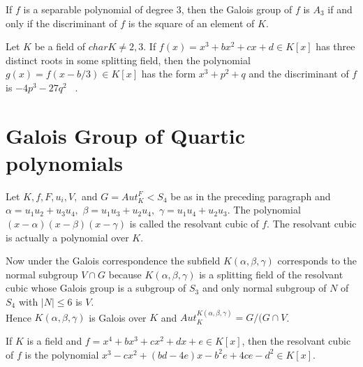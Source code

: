 \begin{corollary}
  If \(f\) is a separable polynomial of degree \(3\), then the Galois group of \(f\) is \(A_3\) if and only if the discriminant of \(f\) is the square of an element of \(K\).
\end{corollary}

\begin{theorem}
  Let \(K\) be a field of \(char K \neq 2,3 \). If \(f(x)=x^3+bx^2+cx+d \in K[x]\) has three distinct roots in some splitting field, then the polynomial \(g(x)=f(x-b/3) \in K[x]\) has the form \(x^3+p^2+q\) and the discriminant of \(f\) is \(-4p^3-27q^2\) ~\cite{hunger}.
\end{theorem}

\section{Galois Group of Quartic polynomials}
\begin{definition}
Let \(K, f, F, u_i, V,\) and \(G=Aut_K^F<S_4\) be as in the preceding paragraph and \(\alpha=u_1u_2+u_3u_4,\) \(\beta=u_1u_3+u_2u_4,\) \(\gamma=u_1u_4+u_2u_3\).
The polynomial \( (x- \alpha)(x- \beta)(x- \gamma) \) is called the resolvant cubic of \(f\). The resolvant cubic is actually a polynomial over \(K\).\\
\end{definition}
Now under the Galois correspondence the subfield \(K(\alpha, \beta, \gamma)\) corresponds to the normal subgroup \(V \cap G\) because \(K(\alpha,\beta,\gamma)\) is a splitting field of the resolvant cubic
whose Galois group is a subgroup of \(S_3\) and only normal subgroup of \(N\) of \(S_4\) with \(|N| \leq 6\) is \(V\).\\
Hence \(K(\alpha, \beta, \gamma)\) is Galois over \(K\) and \(Aut_K^{K(\alpha, \beta, \gamma)} = G/(G \cap V\).

\begin{remark} If \(K\) is a field and \(f = x^4+bx^3+cx^2+dx+e \in K[x]\), then the resolvant cubic of \(f\) is the polynomial \(x^3-cx^2+(bd-4e)x-b^2e+4ce-d^2 \in K[x]\).\\ \\
\end{remark}

